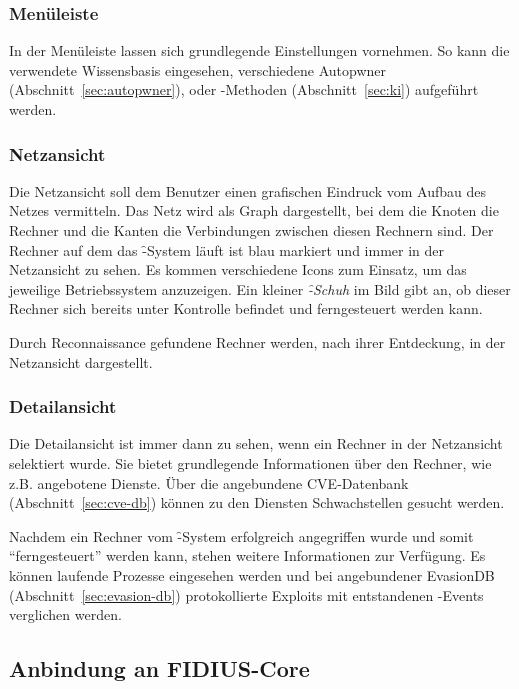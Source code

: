 \subsubsection{Menüleiste}

In der Menüleiste lassen sich grundlegende Einstellungen vornehmen. So kann
die verwendete Wissensbasis eingesehen, verschiedene Autopwner (Abschnitt~\ref{sec:autopwner}),
oder -Methoden (Abschnitt~\ref{sec:ki}) aufgeführt werden.

\subsubsection{Netzansicht}

Die Netzansicht soll dem Benutzer einen grafischen Eindruck vom Aufbau
des Netzes vermitteln. Das Netz wird als Graph dargestellt, bei dem
die Knoten die Rechner und die Kanten die Verbindungen zwischen diesen
Rechnern sind. Der Rechner auf dem das \f-System läuft ist blau markiert und
immer in der Netzansicht zu sehen.
Es kommen verschiedene Icons zum Einsatz, um
das jeweilige Betriebssystem anzuzeigen. Ein kleiner
\textit{\f-Schuh} im Bild gibt an, ob dieser Rechner sich bereits
unter Kontrolle befindet und ferngesteuert werden kann.

Durch Reconnaissance gefundene Rechner werden, nach ihrer Entdeckung,
in der Netzansicht dargestellt.

\subsubsection{Detailansicht}
Die Detailansicht ist immer dann zu sehen, wenn ein Rechner in der
Netzansicht selektiert wurde. Sie bietet grundlegende Informationen
über den Rechner, wie z.B. angebotene Dienste. Über die angebundene
CVE-Datenbank (Abschnitt~\ref{sec:cve-db}) können zu den Diensten
Schwachstellen gesucht werden.

Nachdem ein Rechner vom \f-System erfolgreich angegriffen wurde und
somit \enquote{ferngesteuert} werden kann, stehen weitere Informationen zur
Verfügung. Es können laufende Prozesse eingesehen werden und bei
angebundener EvasionDB (Abschnitt~\ref{sec:evasion-db})
protokollierte Exploits mit entstandenen -Events verglichen
werden.


\subsection{Anbindung an FIDIUS-Core}%
\label{sub_sec:communication_candc_core}

